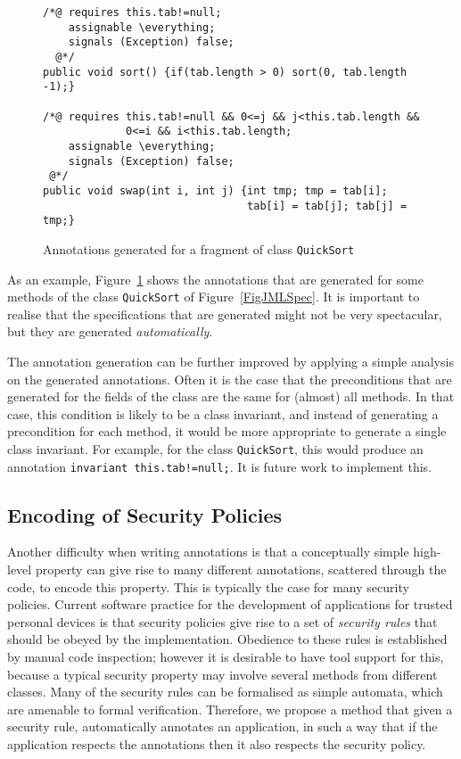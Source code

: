 
\begin{figure}[t!]
{\small
\begin{verbatim}
/*@ requires this.tab!=null;
    assignable \everything;
    signals (Exception) false;
  @*/
public void sort() {if(tab.length > 0) sort(0, tab.length -1);}

/*@ requires this.tab!=null && 0<=j && j<this.tab.length &&
             0<=i && i<this.tab.length;
    assignable \everything;
    signals (Exception) false;
 @*/
public void swap(int i, int j) {int tmp; tmp = tab[i]; 
                                tab[i] = tab[j]; tab[j] = tmp;}
\end{verbatim}
}
\caption{Annotations generated for a fragment of class
\texttt{QuickSort}}\label{FigAnnotSpec} 
\end{figure}

As an example, Figure~\ref{FigAnnotSpec} shows the annotations that
are generated for some methods of the class \texttt{QuickSort} of
Figure~\ref{FigJMLSpec}.
It is important to realise that the specifications that
are generated might not be very spectacular, but they are
generated \emph{automatically}. %

The annotation generation can be further improved by applying a simple
analysis on the generated annotations. Often it is the case that the
preconditions that are generated for the fields of the class are the
same for (almost) all methods. In that case, this condition is likely
to be a class invariant, and instead of generating a precondition for
each method, it would be more appropriate to generate a single class
invariant. For example, for the class
\texttt{QuickSort}, this would produce an annotation
\texttt{invariant this.tab!=null;}. It is future work to implement
this.

\subsection{Encoding of Security Policies}

Another difficulty when writing annotations is that a conceptually
simple high-level property can give rise to many different
annotations, scattered through the code, to encode this property. This
is typically the case for many security policies. Current software
practice for the development of applications for trusted personal
devices is that security policies give rise to a set of \emph{security
rules} that should be obeyed by the implementation. Obedience to these
rules is established by manual code inspection; however it is
desirable to have tool support for this, because a typical security
property may involve several methods from different classes.  Many of
the security rules can be formalised as simple automata, which are
amenable to formal verification. Therefore, we propose a method that
given a security rule, automatically annotates an application, in such
a way that if the application respects the annotations then it also
respects the security policy.

